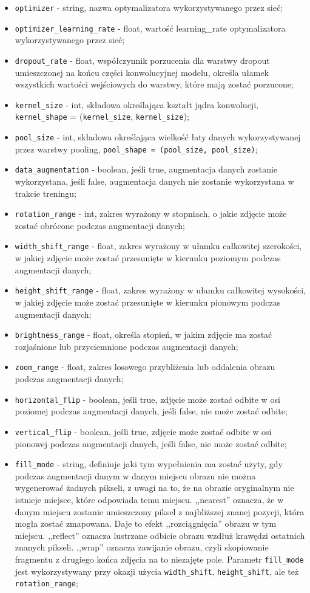 \begin{itemize}
    \item \verb|optimizer| - string, nazwa optymalizatora wykorzystywanego przez sieć;
    \item \verb|optimizer_learning_rate| - float, wartość learning\_rate optymalizatora wykorzystywanego przez sieć;
    \item \verb|dropout_rate| - float, współczynnik porzucenia dla warstwy dropout umieszczonej na końcu części konwolucyjnej modelu, określa ułamek wszystkich wartości wejściowych do warstwy, które mają zostać porzucone; 
    \item \verb|kernel_size| - int, składowa określająca kształt jądra konwolucji, \verb|kernel_shape| = (\verb|kernel_size|, \verb|kernel_size|);
    \item \verb|pool_size| - int, składowa określająca wielkość łaty danych wykorzystywanej przez warstwy pooling, \verb|pool_shape = (pool_size, pool_size)|;
    \item \verb|data_augmentation| - boolean, jeśli true, augmentacja danych zostanie wykorzystana, jeśli false, augmentacja danych nie zostanie wykorzystana w trakcie treningu;
    \item \verb|rotation_range| - int, zakres wyrażony w stopniach, o jakie zdjęcie może zostać obrócone podczas augmentacji danych;
    \item \verb|width_shift_range| - float, zakres wyrażony w ułamku całkowitej szerokości, w jakiej zdjęcie może zostać przesunięte w kierunku poziomym podczas augmentacji danych;
    \item \verb|height_shift_range| - float, zakres wyrażony w ułamku całkowitej wysokości, w jakiej zdjęcie może zostać przesunięte w kierunku pionowym podczas augmentacji danych;
    \item \verb|brightness_range| - float, określa stopień, w jakim zdjęcie ma zostać rozjaśnione lub przyciemnione podczas augmentacji danych;
    \item \verb|zoom_range| - float, zakres losowego przybliżenia lub oddalenia obrazu podczas augmentacji danych;
    \item \verb|horizontal_flip| - boolean, jeśli true, zdjęcie może zostać odbite w osi poziomej podczas augmentacji danych, jeśli false, nie może zostać odbite;
    \item \verb|vertical_flip| - boolean, jeśli true, zdjęcie może zostać odbite w osi pionowej podczas augmentacji danych, jeśli false, nie może zostać odbite; 
    \item \verb|fill_mode| - string, definiuje jaki tym wypełnienia ma zostać użyty, gdy podczas augmentacji danym w danym miejscu obrazu nie można wygenerować żadnych pikseli, z uwagi na to, że na obrazie oryginalnym nie istnieje miejsce, które odpowiada temu miejscu. ,,nearest'' oznacza, że w danym miejscu zostanie umieszczony piksel z najbliższej znanej pozycji, która mogła zostać zmapowana. Daje to efekt ,,rozciągnięcia'' obrazu w tym miejscu. ,,reflect'' oznacza lustrzane odbicie obrazu wzdłuż krawędzi ostatnich znanych pikseli. ,,wrap'' oznacza zawijanie obrazu, czyli skopiowanie fragmentu z drugiego końca zdjęcia na to niezajęte pole. Parametr \verb|fill_mode| jest wykorzystywany przy okazji użycia \verb|width_shift|, \verb|height_shift|, ale też \verb|rotation_range|;

\end{itemize}
